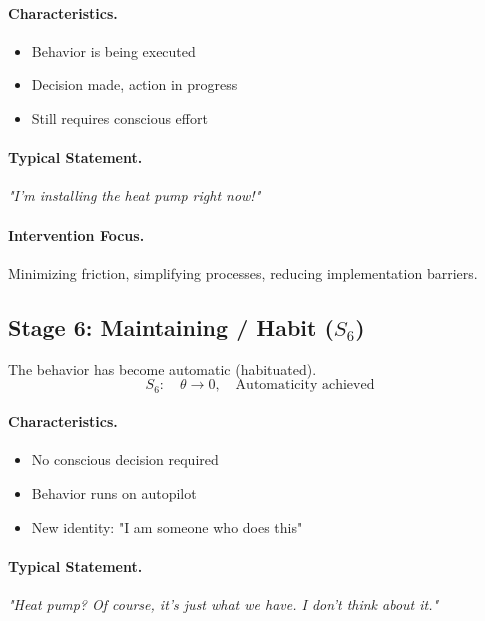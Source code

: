 \paragraph{Characteristics.}
\begin{itemize}
    \item Behavior is being executed
    \item Decision made, action in progress
    \item Still requires conscious effort
\end{itemize}

\paragraph{Typical Statement.}
\textit{"I'm installing the heat pump right now!"}

\paragraph{Intervention Focus.}
Minimizing friction, simplifying processes, reducing implementation barriers.

\subsection{Stage 6: Maintaining / Habit ($S_6$)}
\label{sec:bcj-s6}

\begin{definition}
The behavior has become automatic (habituated).
\begin{equation}
S_6: \quad \theta \to 0, \quad \text{Automaticity achieved}
\end{equation}
\end{definition}

\paragraph{Characteristics.}
\begin{itemize}
    \item No conscious decision required
    \item Behavior runs on autopilot
    \item New identity: "I am someone who does this"
\end{itemize}

\paragraph{Typical Statement.}
\textit{"Heat pump? Of course, it's just what we have. I don't think about it."}

